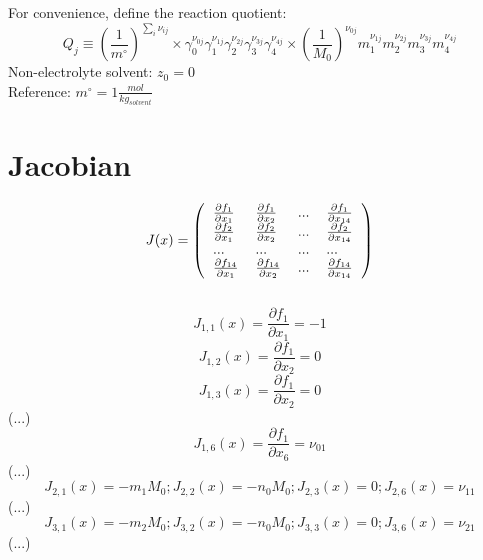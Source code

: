 \documentclass[onecolumn]{article}
\begin{document}
For convenience, define the reaction quotient:\\
\begin{equation}
\label{eq:reaction_quotient}
Q_j \equiv \left(\frac{1}{m^{\circ}}\right)^{\sum_i{\nu_{ij}}}\times
\gamma_0^{\nu_{0j}}\gamma_1^{\nu_{1j}}\gamma_2^{\nu_{2j}}
\gamma_3^{\nu_{3j}}\gamma_4^{\nu_{4j}}\times
\left(\frac{1}{M_0}\right)^{\nu_{0j}}m_1^{\nu_{1j}}m_2^{\nu_{2j}}
m_3^{\nu_{3j}}m_4^{\nu_{4j}}
\end{equation}
Non-electrolyte solvent: $z_0 = 0$ \\
Reference: $m^{\circ} = 1\frac{mol}{kg_{solvent}}$
\section{Jacobian}
\[
J(x) = \left(
\begin{tabular}{llll}
$\frac{\partial{f_1}}{\partial{x_1}}$ &
$\frac{\partial{f_1}}{\partial{x_2}}$ & ... &
$\frac{\partial{f_1}}{\partial{x_{14}}}$\\
$\frac{\partial{f_2}}{\partial{x_1}}$ &
$\frac{\partial{f_2}}{\partial{x_2}}$ & ... &
$\frac{\partial{f_2}}{\partial{x_{14}}}$\\
$...$ & $...$ & $...$ & $...$\\
$\frac{\partial{f_{14}}}{\partial{x_1}}$ &
$\frac{\partial{f_{14}}}{\partial{x_2}}$ & ... &
$\frac{\partial{f_{14}}}{\partial{x_{14}}}$\\
\end{tabular}
\right)
\]\\
\[
J_{1,1}(x) = \frac{\partial{f_{1}}}{\partial{x_1}} =  -1
\]
\[
J_{1,2}(x) = \frac{\partial{f_{1}}}{\partial{x_2}} =  0
\]
\[
J_{1,3}(x) = \frac{\partial{f_{1}}}{\partial{x_2}} =  0
\]
(...)
\[
J_{1,6}(x) = \frac{\partial{f_{1}}}{\partial{x_6}} =  \nu_{01}
\]
(...)
\[
J_{2,1}(x) =  -m_1 M_0;
J_{2,2}(x) =  -n_0 M_0;
J_{2,3}(x) =  0;
J_{2,6}(x) = \nu_{11}
\]
(...)
\[
J_{3,1}(x) =  -m_2 M_0;
J_{3,2}(x) =  -n_0 M_0;
J_{3,3}(x) =  0;
J_{3,6}(x) = \nu_{21}
\]
(...)
\end{document}
